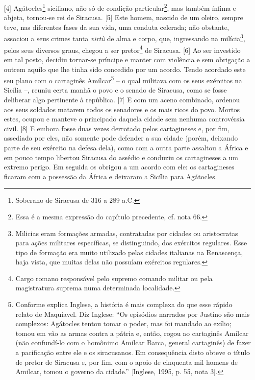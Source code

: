 {[}4{]} Agátocles\footnote{Soberano de Siracusa de 316 a 289 a.C.}
siciliano, não só de condição particular\footnote{Essa é a mesma
  expressão do capítulo precedente, cf. nota 66.}, mas também ínfima e
abjeta, tornou-se rei de Siracusa. {[}5{]} Este homem, nascido de um
oleiro, sempre teve, nas diferentes fases da sua vida, uma conduta
celerada; não obstante, associou a seus crimes tanta \emph{virtù} de
alma e corpo, que, ingressando na milícia\footnote{Milicias eram
  formações armadas, contratadas por cidades ou aristocratas para ações
  militares específicas, se distinguindo, dos exércitos regulares. Esse
  tipo de formação era muito utilizado pelas cidades italianas na
  Renascença, haja vista, que muitas delas não possuíam exércitos
  regulares.}, pelos seus diversos graus, chegou a ser pretor\footnote{Cargo
  romano responsável pelo supremo comando militar ou pela magistratura
  suprema numa determinada localidade.} de Siracusa. {[}6{]} Ao ser
investido em tal posto, decidiu tornar-se príncipe e manter com
violência e sem obrigação a outrem aquilo que lhe tinha sido concedido
por um acordo. Tendo acordado este seu plano com o cartaginês
Amílcar\footnote{Conforme explica Inglese, a história é mais complexa do
  que esse rápido relato de Maquiavel. Diz Inglese: ``Os episódios
  narrados por Justino são mais complexos: Agátocles tentou tomar o
  poder, mas foi mandado ao exílio; tomou em vão as armas contra a
  pátria e, então, rogou ao cartaginês Amílcar (não confundí-lo com o
  homônimo Amílcar Barca, general cartaginês) de fazer a pacificação
  entre ele e os siracusanos. Em consequência disto obteve o título de
  pretor de Siracusa e, por fim, com o apoio de cinquenta mil homens de
  Amilcar, tomou o governo da cidade.'' {[}Inglese, 1995, p. 55, nota
  3{]}.} -- o qual militava com os seus exércitos na Sicília --, reuniu
certa manhã o povo e o senado de Siracusa, como se fosse deliberar algo
pertinente à república. {[}7{]} E com um aceno combinado, ordenou aos
seus soldados matarem todos os senadores e os mais ricos do povo. Mortos
estes, ocupou e manteve o principado daquela cidade sem nenhuma
controvérsia civil. {[}8{]} E embora fosse duas vezes derrotado pelos
cartagineses e, por fim, assediado por eles, não somente pode defender a
sua cidade (porém, deixando parte de seu exército na defesa dela), como
com a outra parte assaltou a África e em pouco tempo libertou Siracusa
do assédio e conduziu os cartagineses a um extremo perigo. Em seguida os
obrigou a um acordo com ele: os cartagineses ficaram com a possessão da
África e deixaram a Sicília para Agátocles.

